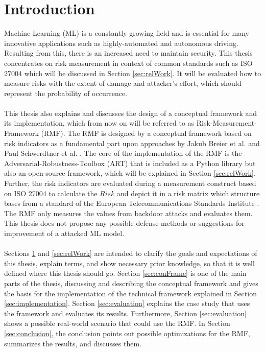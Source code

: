 \section{Introduction}
\label{sec:intro}

Machine Learning (ML) is a constantly growing field and is essential for many innovative applications such as highly-automated and autonomous driving. Resulting from this,
there is an increased need to maintain security. This thesis concentrates on risk measurement in context of common standards such as ISO 27004 which will be
discussed in Section \ref{sec:relWork}. It will be evaluated how to measure risks with the extent of damage and attacker's effort, which should represent the probability of occurrence. \\ \\

This thesis also explains and discusses the design of a conceptual framework and its implementation, which from now on will be referred to as Risk-Measurement-Framework (RMF). The RMF is designed by a
conceptual framework based on risk indicators as a fundamental part upon approaches by Jakub Breier et al. \cite{DBLP:journals/corr/abs-2012-04884} and Paul Schwerdtner et al.
\cite{DBLP:journals/corr/abs-2011-04328}. The core of the implementation of the RMF is the Adversarial-Robustness-Toolbox (ART) that is included as a Python library but also an open-source
framework, which will be explained in Section \ref{sec:relWork}. Further, the risk indicators are evaluated during a measurement construct based on ISO 27004 to calculate the $Risk$ and depict it in a risk matrix which structure bases from a standard of the European Telecommunications Standards Institute \cite{applications_2022}. The RMF only measures the values from backdoor attacks and evaluates them. This thesis does not propose any possible defense methods or suggestions for improvement of a attacked ML model. \\ \\

Sections \ref{sec:intro} and \ref{sec:relWork} are intended to clarify the goals and expectations of this thesis, explain terms, and show necessary prior knowledge, so that it is well defined where this thesis should go. Section \ref{sec:conFrame} is one of the main parts of the thesis, discussing and describing the conceptual framework and gives the basis for the implementation of the technical framework explained in Section \ref{sec:implementation}. Section \ref{sec:evaluation} explains the case study that uses the framework and evaluates its results. Furthermore, Section
\ref{sec:evaluation} shows a possible real-world scenario that could use the RMF. In Section \ref{sec:conclusion}, the conclusion points out possible optimizations for the RMF, summarizes the results, and discusses them.

